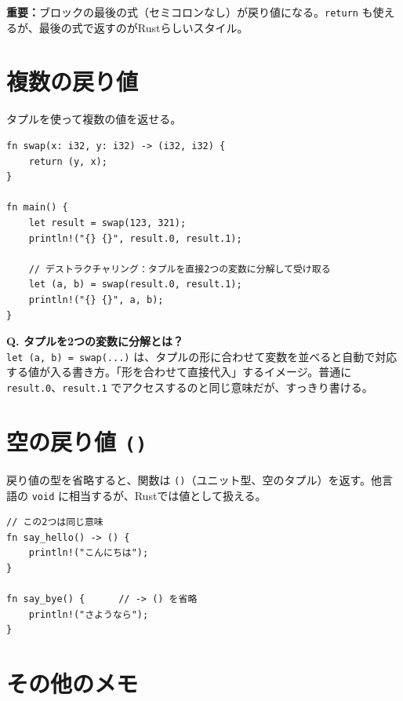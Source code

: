 \documentclass[12pt,a4paper]{article}
\begin{document}
\begin{pointbox}
\textbf{重要：}ブロックの最後の式（セミコロンなし）が戻り値になる。\texttt{return} も使えるが、最後の式で返すのがRustらしいスタイル。
\end{pointbox}

\section{複数の戻り値}

タプルを使って複数の値を返せる。

\begin{lstlisting}
fn swap(x: i32, y: i32) -> (i32, i32) {
    return (y, x);
}

fn main() {
    let result = swap(123, 321);
    println!("{} {}", result.0, result.1);

    // デストラクチャリング：タプルを直接2つの変数に分解して受け取る
    let (a, b) = swap(result.0, result.1);
    println!("{} {}", a, b);
}
\end{lstlisting}

\begin{qabox}
\textbf{Q. タプルを2つの変数に分解とは？}\\
\texttt{let (a, b) = swap(...)} は、タプルの形に合わせて変数を並べると自動で対応する値が入る書き方。「形を合わせて直接代入」するイメージ。普通に \texttt{result.0}、\texttt{result.1} でアクセスするのと同じ意味だが、すっきり書ける。
\end{qabox}

\section{空の戻り値 \texttt{()}}

戻り値の型を省略すると、関数は \texttt{()}（ユニット型、空のタプル）を返す。他言語の \texttt{void} に相当するが、Rustでは値として扱える。

\begin{lstlisting}
// この2つは同じ意味
fn say_hello() -> () {
    println!("こんにちは");
}

fn say_bye() {      // -> () を省略
    println!("さようなら");
}
\end{lstlisting}

\section*{その他のメモ}
\end{document}
